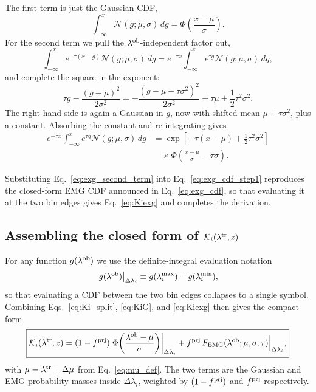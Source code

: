 \documentclass[a4paper, 11pt]{article}
\newcommand{\ltr}{\lambda^{\rm tr}}
\newcommand{\lob}{\lambda^{\rm ob}}
\begin{document}
The first term is just the Gaussian CDF,
\begin{equation}
\int_{-\infty}^{x}\mathcal N(g;\mu,\sigma)\,dg
=
\Phi\!\left(\frac{x-\mu}{\sigma}\right).
\end{equation}
For the second term we pull the $\lob$-independent factor out,
\begin{equation}
\int_{-\infty}^{x} e^{-\tau(x-g)}\mathcal N(g;\mu,\sigma)\,dg
=
e^{-\tau x}
\int_{-\infty}^{x} e^{\tau g}\mathcal N(g;\mu,\sigma)\,dg,
\end{equation}
and complete the square in the exponent:
\begin{equation}
\tau g - \frac{(g-\mu)^2}{2\sigma^2}
=
-\frac{(g-\mu-\tau\sigma^2)^2}{2\sigma^2}
+
\tau\mu + \frac{1}{2}\tau^2\sigma^2.
\label{eq:complete_square}
\end{equation}
The right-hand side is again a Gaussian in $g$, now with shifted mean $\mu+\tau\sigma^2$, plus a constant. Absorbing the constant and re-integrating gives
\begin{equation}
\begin{aligned}
e^{-\tau x}\int_{-\infty}^{x} e^{\tau g}\mathcal N(g;\mu,\sigma)\,dg
&=
\exp\!\left[-\tau(x-\mu)+\frac{1}{2}\tau^2\sigma^2\right] \\
&\quad\times
\Phi\!\left(\frac{x-\mu}{\sigma}-\tau\sigma\right).
\end{aligned}
\label{eq:exg_second_term}
\end{equation}

Substituting Eq.~\eqref{eq:exg_second_term} into Eq.~\eqref{eq:exg_cdf_step1} reproduces the closed-form EMG CDF announced in Eq.~\eqref{eq:exg_cdf}, so that evaluating it at the two bin edges gives Eq.~\eqref{eq:Kiexg} and completes the derivation.

\subsection{Assembling the closed form of $\mathcal K_i(\ltr,z)$}

For any function $g(\lob)$ we use the definite-integral evaluation notation
\[
\left.g(\lob)\right|_{\Delta\lambda_i}
\equiv
g(\lambda_i^{\max}) - g(\lambda_i^{\min}),
\]
so that evaluating a CDF between the two bin edges collapses to a single symbol. Combining Eqs.~\eqref{eq:Ki_split}, \eqref{eq:KiG}, and \eqref{eq:Kiexg} then gives the compact form
\begin{equation}
\boxed{
\mathcal K_i(\ltr,z)
=
(1-f^{\rm prj})\left.\Phi\!\left(\frac{\lob-\mu}{\sigma}\right)\right|_{\Delta\lambda_i}
+
f^{\rm prj}\,\Big.F_{\rm EMG}(\lob;\mu,\sigma,\tau)\Big|_{\Delta\lambda_i},
}
\label{eq:Ki_final}
\end{equation}
with $\mu=\ltr+\Delta\mu$ from Eq.~\eqref{eq:mu_def}. The two terms are the Gaussian and EMG probability masses inside $\Delta\lambda_i$, weighted by $(1-f^{\rm prj})$ and $f^{\rm prj}$ respectively.
\end{document}
